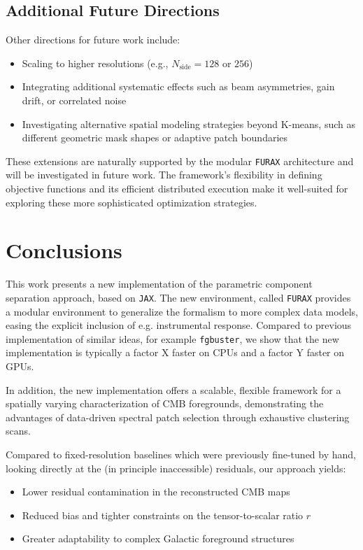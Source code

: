\documentclass[fleqn,usenatbib]{mnras}
\begin{document}
\subsection*{Additional Future Directions}

Other directions for future work include:
\begin{itemize}
    \item Scaling to higher resolutions (e.g., \( N_{\text{side}} = 128 \) or \( 256 \))
    \item Integrating additional systematic effects such as beam asymmetries, gain drift, or correlated noise
    \item Investigating alternative spatial modeling strategies beyond K-means, such as different geometric mask shapes or adaptive patch boundaries
\end{itemize}

These extensions are naturally supported by the modular \texttt{FURAX} architecture and will be investigated in future work. The framework's flexibility in defining objective functions and its efficient distributed execution make it well-suited for exploring these more sophisticated optimization strategies.

\section{Conclusions}
\label{sec:conclusion}

This work presents a new implementation of the parametric component separation approach, based on \texttt{JAX}. The new environment, called \texttt{FURAX} provides a modular environment to generalize the formalism to more complex data models, easing the explicit inclusion of e.g. instrumental response. Compared to previous implementation of similar ideas, for example \texttt{fgbuster}, we show that the new implementation is typically a factor X faster on CPUs and a factor Y faster on GPUs. 

In addition, the new implementation offers a scalable, flexible framework for a spatially varying characterization of CMB foregrounds, demonstrating the advantages of data-driven spectral patch selection through exhaustive clustering scans.

Compared to fixed-resolution baselines which were previously fine-tuned by hand, looking directly at the (in principle inaccessible) residuals, our approach yields:
\begin{itemize}
    \item Lower residual contamination in the reconstructed CMB maps
    \item Reduced bias and tighter constraints on the tensor-to-scalar ratio \( r \)
    \item Greater adaptability to complex Galactic foreground structures
\end{itemize}
\end{document}
